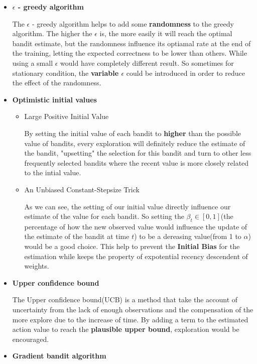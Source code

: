 \documentclass{article}
\begin{document}
\begin{itemize}
    \item \textbf{$\epsilon$ - greedy algorithm}
    
    The $\epsilon$ - greedy algorithm helps to add some \textbf{randomness} to the greedy algorithm. The higher the $\epsilon$ is,
    the more easily it will reach the optimal bandit estimate, but the randomness influence its optiamal rate at the 
    end of the training, letting the expected correctness to be lower than others. While using a small $\epsilon$ would 
    have completely different result. So sometimes for stationary condition, the \textbf{variable $\epsilon$} could be 
    introduced in order to reduce the effect of the randomness.
    \item \textbf{Optimistic initial values}
    \begin{itemize}
        \item \textsf{Large Positive Initial Value}
        
        By setting the initial value of each bandit to \textbf{higher} than the possible value of bandits, every exploration will
        definitely reduce the estimate of the bandit, "upsetting" the selection for this bandit and turn to other less 
        frequently selected bandits where the recent value is more closely related to the intial value.
        \item \textsf{An Unbiased Constant-Stepsize Trick}
        
        As we can see, the setting of our initial value directly influence our estimate of the value for each bandit.
        So  setting the $\beta_t \in [0,1]$(the percentage of how the new observed value would influence the update of the estimate 
        of the bandit at time $t$) to be a dereasing value(from 1 to $\alpha$) would be a good choice. This help to prevent the
        \textbf{Initial Bias} for the estimation while keeps the property of expotential recency descendent of weights.
    \end{itemize}
    \item \textbf{Upper confidence bound}
    
    The Upper confidence bound(UCB) is a method that take the account of uncertainty from the lack of enough
    observations and the compensation of the more explore due to the increase of time. By adding a term to 
    the estimated action value to reach the \textbf{plausible upper bound}, exploration would be encouraged.
    \item \textbf{Gradient bandit algorithm}
    

\end{itemize}
\end{document}
